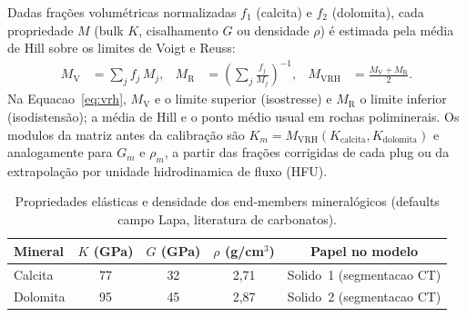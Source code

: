 \documentclass[11pt,a4paper]{article}
\numberwithin{equation}{section}
\begin{document}
Dadas frações volumétricas normalizadas $f_1$ (calcita) e $f_2$
(dolomita), cada propriedade $M$ (bulk $K$, cisalhamento $G$ ou densidade
$\rho$) é estimada pela média de Hill sobre os limites de Voigt e Reuss:
\begin{align}
  M_{\mathrm{V}} &= \sum_{j} f_j\, M_j,
  &
  M_{\mathrm{R}} &= \left(\sum_{j} \frac{f_j}{M_j}\right)^{-1},
  &
  M_{\mathrm{VRH}} &= \frac{M_{\mathrm{V}} + M_{\mathrm{R}}}{2}.
  \label{eq:vrh}
\end{align}
Na Equacao~\eqref{eq:vrh}, $M_{\mathrm{V}}$ e o limite superior (isostresse)
e $M_{\mathrm{R}}$ o limite inferior (isodistensão); a média de Hill e o
ponto médio usual em rochas poliminerais.
Os modulos da matriz antes da calibração são
$K_m = M_{\mathrm{VRH}}(K_{\mathrm{calcita}},K_{\mathrm{dolomita}})$ e
analogamente para $G_m$ e $\rho_m$, a partir das frações corrigidas de
cada plug ou da extrapolação por unidade hidrodinamica de fluxo (HFU).

\begin{table}[H]
  \centering
  \caption{Propriedades elásticas e densidade dos end-members mineralógicos
           (defaults campo Lapa, literatura de carbonatos).}
  \label{tab:app_minerals}
  \begin{tabular}{lcccc}
    \toprule
    Mineral & $K$ (GPa) & $G$ (GPa) & $\rho$ (g/cm$^3$) & Papel no modelo \\
    \midrule
    Calcita   & 77 & 32 & 2,71 & Solido~1 (segmentacao CT) \\
    Dolomita  & 95 & 45 & 2,87 & Solido~2 (segmentacao CT) \\
    \bottomrule
  \end{tabular}
\end{table}
\end{document}
